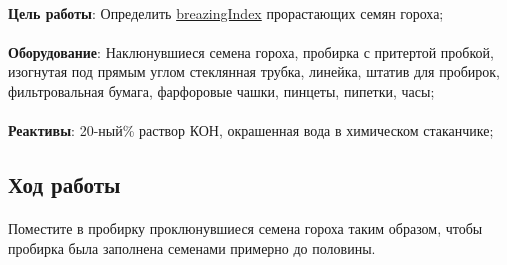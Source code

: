 




\begin{footnotesize}

\paragraph*{}\textbf{Цель работы}: \hypertarget{breazing_index_lab}{Определить} \hyperlink{breazing_index}{\gls{breazingIndex}} прорастающих семян гороха;

\paragraph*{}\textbf{Оборудование}: Наклюнувшиеся семена гороха, пробирка с притертой пробкой, изогнутая под прямым углом стеклянная трубка, линейка, штатив
для пробирок, фильтровальная бумага, фарфоровые чашки, пинцеты, пипетки, часы;

\paragraph*{}\textbf{Реактивы}: 20-ный\% раствор КОН, окрашенная вода в
химическом стаканчике;

\end{footnotesize}

\subsection*{Ход работы}

\paragraph*{}Поместите в пробирку проклюнувшиеся семена гороха таким образом, чтобы пробирка была заполнена семенами примерно до половины. 

